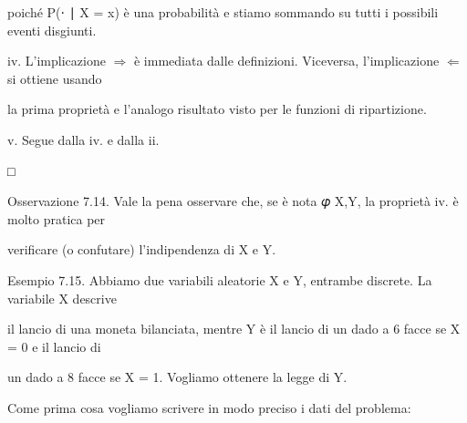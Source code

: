\documentclass[a4paper,portrait,12pt]{article}
\begin{document}
\begin{flushleft}
poich\'{e} P(⋅ ∣ X = x) \`{e} una probabilit\`{a} e stiamo sommando su tutti i possibili eventi disgiunti.
\end{flushleft}


\begin{flushleft}
iv. L'implicazione $\Rightarrow$ \`{e} immediata dalle definizioni. Viceversa, l'implicazione $\Leftarrow$ si ottiene usando
\end{flushleft}


\begin{flushleft}
la prima propriet\`{a} e l'analogo risultato visto per le funzioni di ripartizione.
\end{flushleft}


\begin{flushleft}
v. Segue dalla iv. e dalla ii.
\end{flushleft}





□





\begin{flushleft}
Osservazione 7.14. Vale la pena osservare che, se \`{e} nota 𝜑 X,Y, la propriet\`{a} iv. \`{e} molto pratica per
\end{flushleft}


\begin{flushleft}
verificare (o confutare) l'indipendenza di X e Y.
\end{flushleft}


\begin{flushleft}
Esempio 7.15. Abbiamo due variabili aleatorie X e Y, entrambe discrete. La variabile X descrive
\end{flushleft}


\begin{flushleft}
il lancio di una moneta bilanciata, mentre Y \`{e} il lancio di un dado a 6 facce se X = 0 e il lancio di
\end{flushleft}


\begin{flushleft}
un dado a 8 facce se X = 1. Vogliamo ottenere la legge di Y.
\end{flushleft}


\begin{flushleft}
Come prima cosa vogliamo scrivere in modo preciso i dati del problema:
\end{flushleft}
\end{document}
